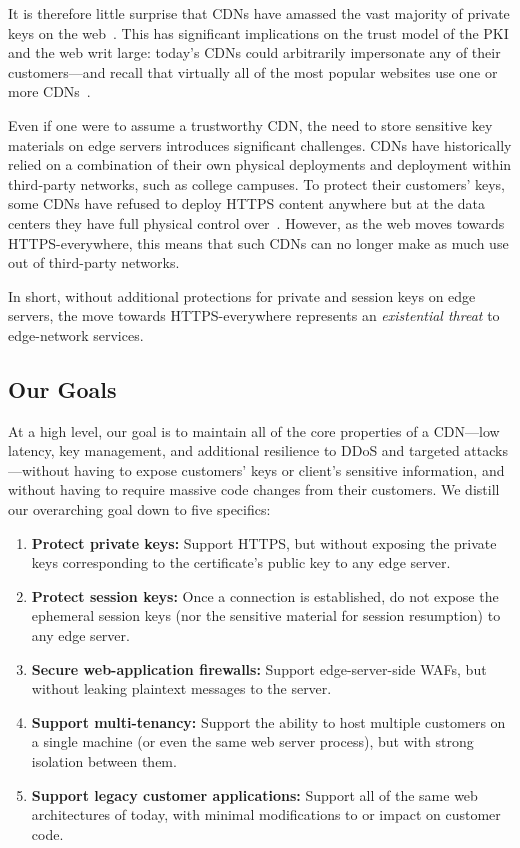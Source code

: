 It is therefore little surprise that CDNs have amassed the vast
majority of private keys on the
web~\cite{key-sharing,when-https-meets-cdn}.
%
This has significant implications on the trust model of the PKI and the
web writ large: today's CDNs could arbitrarily impersonate any of their
customers---and recall that virtually all of the most popular websites
use one or more CDNs~\cite{key-sharing}.

Even if one were to assume a trustworthy CDN, the need to store
sensitive key materials on edge servers introduces significant
challenges.
%
CDNs have historically relied on a combination of their own physical
deployments and deployment within third-party networks, such as college
campuses.
%
To protect their customers' keys, some CDNs have refused to deploy
HTTPS content anywhere but at the data centers they have full physical
control over~\cite{securing-cdns}.
%
However, as the web moves towards HTTPS-everywhere, this means that
such CDNs can no longer make as much use out of third-party networks.


In short, without additional protections for private and session keys
on edge servers, the move towards HTTPS-everywhere represents an
\emph{existential threat} to edge-network services.


\subsection{Our Goals} %
\label{sec:goals}

At a high level, our goal is to maintain all of the core properties of
a CDN---low latency, key management, and additional resilience to DDoS
and targeted attacks---without having to expose customers' keys or
client's sensitive information, and without having to require massive
code changes from their customers.
%
We distill our overarching goal down to five specifics:

\begin{enumerate}
	\item \textbf{Protect private keys:} Support HTTPS, but without
		exposing the private keys corresponding to the certificate's
		public key to any edge server.
	\item \textbf{Protect session keys:} Once a connection is
		established, do not expose the ephemeral session keys (nor the
		sensitive material for session resumption) to any edge server.
	\item \textbf{Secure web-application firewalls:} Support
		edge-server-side WAFs, but without leaking plaintext messages
		to the server.
	\item \textbf{Support multi-tenancy:} Support the ability to host
		multiple customers on a single machine (or even the same web
		server process), but with strong isolation between them.
	\item \textbf{Support legacy customer applications:} Support all of
		the same web architectures of today, with minimal modifications
		to or impact on customer code.
\end{enumerate}

